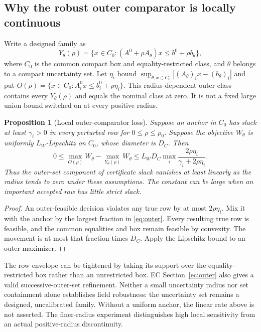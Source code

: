 \documentclass[11pt,letterpaper]{article}
\newtheorem{proposition}[theorem]{Proposition}
\theoremstyle{definition}\newtheorem{assumption}[theorem]{Assumption}
\begin{document}
\subsection{Why the robust outer comparator is locally continuous}
Write a designed family as
\[
 Y_\theta(\rho)=\{x\in C_0:(A^0+\rho A_\theta)x\leq b^0+\rho b_\theta\},
\]
where $C_0$ is the common compact box and equality-restricted class, and $\theta$ belongs to a compact uncertainty set. Let $\eta_i$ bound
$\sup_{\theta,x\in C_0}|(A_\theta)_i x-(b_\theta)_i|$ and put
$O(\rho)=\{x\in C_0:A_i^0x\leq b_i^0+\rho\eta_i\}$.
This radius-dependent outer class contains every $Y_\theta(\rho)$ and equals the nominal class at zero. It is not a fixed large union bound switched on at every positive radius.
\begin{proposition}[Local outer-comparator loss]\label{prop:outer}
Suppose an anchor in $C_0$ has slack at least $\gamma_i>0$ in every perturbed row for $0\leq\rho\leq\rho_0$. Suppose the objective $W_\theta$ is uniformly $L_W$-Lipschitz on $C_0$, whose diameter is $D_C$. Then
\begin{equation}\label{eq:outer}
 0\leq\max_{O(\rho)}W_\theta-\max_{Y_\theta(\rho)}W_\theta
 \leq L_WD_C\max_i\frac{2\rho\eta_i}{\gamma_i+2\rho\eta_i}.
\end{equation}
Thus the outer-set component of certificate slack vanishes at least linearly as the radius tends to zero under these assumptions. The constant can be large when an important accepted row has little strict slack.
\end{proposition}
\begin{proof}
An outer-feasible decision violates any true row by at most $2\rho\eta_i$. Mix it with the anchor by the largest fraction in \eqref{eq:outer}. Every resulting true row is feasible, and the common equalities and box remain feasible by convexity. The movement is at most that fraction times $D_C$. Apply the Lipschitz bound to an outer maximizer.\end{proof}

The row envelope can be tightened by taking its support over the equality-restricted box rather than an unrestricted box. EC Section~\ref{ec:outer} also gives a valid successive-outer-set refinement. Neither a small uncertainty radius nor set containment alone establishes field robustness: the uncertainty set remains a designed, uncalibrated family. Without a uniform anchor, the linear rate above is not asserted. The finer-radius experiment distinguishes high local sensitivity from an actual positive-radius discontinuity.
\end{document}
